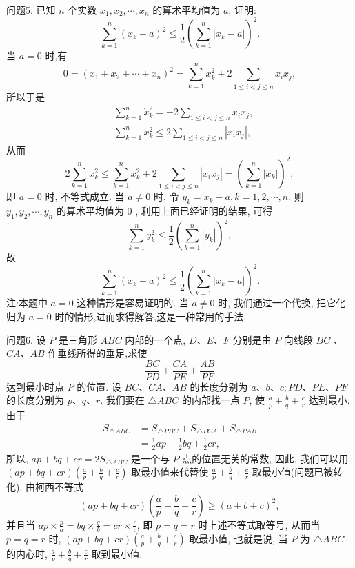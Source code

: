 问题5. 已知 $n$ 个实数 $x_1, x_2, \cdots, x_n$ 的算术平均值为 $a$, 证明:
$$
\sum_{k=1}^n\left(x_k-a\right)^2 \leqslant \frac{1}{2}\left(\sum_{k=1}^n\left|x_k-a\right|\right)^2 .
$$
当 $a=0$ 时,有
$$
0=\left(x_1+x_2+\cdots+x_n\right)^2=\sum_{k=1}^n x_k^2+2 \sum_{1 \leqslant i<j \leqslant n} x_i x_j,
$$
所以于是
$$
\begin{aligned}
& \sum_{k=1}^n \dot{x}_k^2=-2 \sum_{1 \leqslant i<j \leqslant n} x_i x_j, \\
& \sum_{k=1}^n x_k^2 \leqslant 2 \sum_{1 \leqslant i<j \leqslant n}\left|x_i x_j\right|,
\end{aligned}
$$
从而
$$
2 \sum_{k=1}^n x_k^2 \leqslant \sum_{k=1}^n x_k^2+2 \sum_{1 \leqslant i<j \leqslant n}\left|x_i x_j\right|=\left(\sum_{k=1}^n\left|x_k\right|\right)^2,
$$
即 $a=0$ 时, 不等式成立.
当 $a \neq 0$ 时, 令 $y_k=x_k-a, k=1,2, \cdots, n$, 则 $y_1, y_2, \cdots, y_n$ 的算术平均值为 0 , 利用上面已经证明的结果, 可得
$$
\sum_{k=1}^n y_k^2 \leqslant \frac{1}{2}\left(\sum_{k=1}^n\left|y_k\right|\right)^2,
$$
故
$$
\sum_{k=1}^n\left(x_k-a\right)^2 \leqslant \frac{1}{2}\left(\sum_{k=1}^n\left|x_k-a\right|\right)^2 .
$$
注:本题中 $a=0$ 这种情形是容易证明的.
当 $a \neq 0$ 时, 我们通过一个代换, 把它化归为 $a=0$ 时的情形,进而求得解答,这是一种常用的手法.



问题6. 设 $P$ 是三角形 $A B C$ 内部的一个点, $D 、 E 、 F$ 分别是由 $P$ 向线段 $B C$ 、 $C A 、 A B$ 作垂线所得的垂足,求使
$$
\frac{B C}{P D}+\frac{C A}{P E}+\frac{A B}{P F}
$$
达到最小时点 $P$ 的位置.
设 $B C 、 C A 、 A B$ 的长度分别为 $a 、 b 、 c ; P D 、 P E 、 P F$ 的长度分别为 $p 、 q 、 r$. 我们要在 $\triangle A B C$ 的内部找一点 $P$, 使 $\frac{a}{p}+\frac{b}{q}+\frac{c}{r}$ 达到最小.
由于
$$
\begin{aligned}
S_{\triangle A B C} & =S_{\triangle P B C}+S_{\triangle P C A}+S_{\triangle P A B} \\
& =\frac{1}{2} a p+\frac{1}{2} b q+\frac{1}{2} c r,
\end{aligned}
$$
所以, $a p+b q+c r=2 S_{\triangle A B C}$ 是一个与 $P$ 点的位置无关的常数, 因此, 我们可以用 $(a p+b q+c r)\left(\frac{a}{p}+\frac{b}{q}+\frac{c}{r}\right)$ 取最小值来代替使 $\frac{a}{p}+\frac{b}{q}+\frac{c}{r}$ 取最小值(问题已被转化).
由柯西不等式
$$
(a p+b q+c r)\left(\frac{a}{p}+\frac{b}{q}+\frac{c}{r}\right) \geqslant(a+b+c)^2,
$$
并且当 $a p \times \frac{p}{a}=b q \times \frac{q}{b}=c r \times \frac{r}{c}$, 即 $p=q=r$ 时上述不等式取等号, 从而当 $p=q=r$ 时, $(a p+b q+c r)\left(\frac{a}{p}+\frac{b}{q}+\frac{c}{r}\right)$ 取最小值, 也就是说, 当 $P$ 为 $\triangle A B C$ 的内心时, $\frac{a}{p}+\frac{b}{q}+\frac{c}{r}$ 取到最小值.



